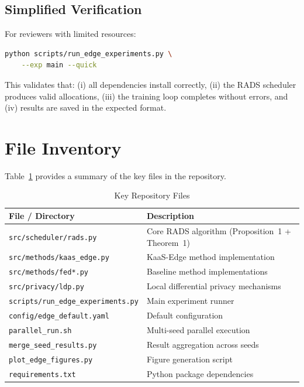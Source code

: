 \documentclass[conference]{IEEEtran}
\begin{document}
\subsection{Simplified Verification}

For reviewers with limited resources:

\begin{lstlisting}[language=bash]
python scripts/run_edge_experiments.py \
    --exp main --quick
\end{lstlisting}

This validates that: (i) all dependencies install correctly, (ii) the RADS scheduler produces valid allocations, (iii) the training loop completes without errors, and (iv) results are saved in the expected format.

\section{File Inventory}

Table~\ref{tab:files} provides a summary of the key files in the repository.

\begin{table}[h]
\centering
\caption{Key Repository Files}
\label{tab:files}
\begin{tabular}{@{}p{}p{}@{}}
\toprule
File / Directory & Description \\
\midrule
\texttt{src/scheduler/rads.py}      & Core RADS algorithm (Proposition~1 + Theorem~1) \\
\texttt{src/methods/kaas\_edge.py}  & KaaS-Edge method implementation \\
\texttt{src/methods/fed*.py}        & Baseline method implementations \\
\texttt{src/privacy/ldp.py}         & Local differential privacy mechanisms \\
\texttt{scripts/run\_edge\_experiments.py} & Main experiment runner \\
\texttt{config/edge\_default.yaml}  & Default configuration \\
\texttt{parallel\_run.sh}           & Multi-seed parallel execution \\
\texttt{merge\_seed\_results.py}    & Result aggregation across seeds \\
\texttt{plot\_edge\_figures.py}     & Figure generation script \\
\texttt{requirements.txt}           & Python package dependencies \\
\bottomrule
\end{tabular}
\end{table}
\end{document}
